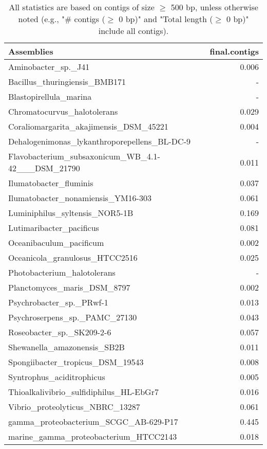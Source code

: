 \documentclass[12pt,a4paper]{article}
\begin{document}
\begin{table}[ht]
\begin{center}
\caption{All statistics are based on contigs of size $\geq$ 500 bp, unless otherwise noted (e.g., "\# contigs ($\geq$ 0 bp)" and "Total length ($\geq$ 0 bp)" include all contigs).}
\begin{tabular}{|l*{1}{|r}|}
\hline
Assemblies & final.contigs \\ \hline
Aminobacter\_sp.\_J41 & 0.006 \\ \hline
Bacillus\_thuringiensis\_BMB171 & - \\ \hline
Blastopirellula\_marina & - \\ \hline
Chromatocurvus\_halotolerans & 0.029 \\ \hline
Coraliomargarita\_akajimensis\_DSM\_45221 & 0.004 \\ \hline
Dehalogenimonas\_lykanthroporepellens\_BL-DC-9 & - \\ \hline
Flavobacterium\_subsaxonicum\_WB\_4.1-42\_\_\_DSM\_21790 & 0.011 \\ \hline
Ilumatobacter\_fluminis & 0.037 \\ \hline
Ilumatobacter\_nonamiensis\_YM16-303 & 0.061 \\ \hline
Luminiphilus\_syltensis\_NOR5-1B & 0.169 \\ \hline
Lutimaribacter\_pacificus & 0.081 \\ \hline
Oceanibaculum\_pacificum & 0.002 \\ \hline
Oceanicola\_granulosus\_HTCC2516 & 0.025 \\ \hline
Photobacterium\_halotolerans & - \\ \hline
Planctomyces\_maris\_DSM\_8797 & 0.002 \\ \hline
Psychrobacter\_sp.\_PRwf-1 & 0.013 \\ \hline
Psychroserpens\_sp.\_PAMC\_27130 & 0.043 \\ \hline
Roseobacter\_sp.\_SK209-2-6 & 0.057 \\ \hline
Shewanella\_amazonensis\_SB2B & 0.011 \\ \hline
Spongiibacter\_tropicus\_DSM\_19543 & 0.008 \\ \hline
Syntrophus\_aciditrophicus & 0.005 \\ \hline
Thioalkalivibrio\_sulfidiphilus\_HL-EbGr7 & 0.016 \\ \hline
Vibrio\_proteolyticus\_NBRC\_13287 & 0.061 \\ \hline
gamma\_proteobacterium\_SCGC\_AB-629-P17 & 0.445 \\ \hline
marine\_gamma\_proteobacterium\_HTCC2143 & 0.018 \\ \hline
\end{tabular}
\end{center}
\end{table}
\end{document}
